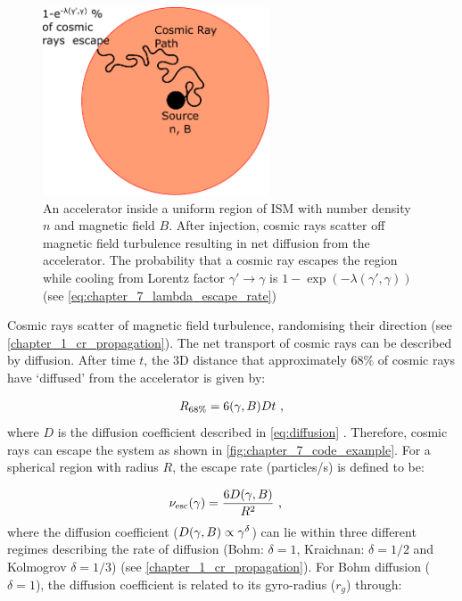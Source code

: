 \begin{figure}
    \centering
    \includegraphics[width=0.6\textwidth]{07_Particle_Evolution/Images/Code/code_example.pdf}
    \caption{An accelerator inside a uniform region of ISM with number density $n$ and magnetic field $B$. After injection, cosmic rays scatter off magnetic field turbulence resulting in net diffusion from the accelerator. The probability that a cosmic ray escapes the region while cooling from Lorentz factor $\gamma'\rightarrow\gamma$ is $1-\exp(-\lambda(\gamma',\gamma))$ (see \autoref{eq:chapter_7_lambda_escape_rate})}
    \label{fig:chapter_7_code_example}
\end{figure}

Cosmic rays scatter of magnetic field turbulence, randomising their direction (see \autoref{chapter_1_cr_propagation}). The net transport of cosmic rays can be described by diffusion. After time $t$, the 3D distance that approximately $68\%$ of cosmic rays have `diffused' from the accelerator is given by:

\begin{equation}
    \begin{aligned}
        R_{68\%}=6\qty(\gamma,B)Dt\text{ ,}
    \end{aligned} \label{eq:chapter_7_6Dt}
\end{equation}
\noindent where $D$ is the diffusion coefficient described in \autoref{eq:diffusion} \citep{1996A&A...309..917A}. Therefore, cosmic rays can escape the system as shown in \autoref{fig:chapter_7_code_example}. For a spherical region with radius $R$, the escape rate (particles/s) is defined to be:

\begin{equation}
    \begin{aligned}
    \nu_\text{esc}\qty(\gamma)&=\frac{6D\qty(\gamma,B)}{R^2}\text{ ,}
    \end{aligned} \label{eq:chapter_7_escape_rate}
\end{equation}
\noindent where the diffusion coefficient ($D\qty(\gamma,B)\propto \gamma^\delta $) can lie within three different regimes describing the rate of diffusion (Bohm: $\delta=1$, Kraichnan: $\delta=1/2$ and Kolmogrov $\delta =1/3$) (see \autoref{chapter_1_cr_propagation}). \noindent For Bohm diffusion ($\delta=1$), the diffusion coefficient is related to its gyro-radius ($r_g$) through:

